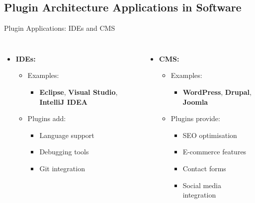 \documentclass[aspectratio=169, table]{beamer}
\begin{document}
\subsection{Plugin Architecture Applications in Software}

\begin{frame}{Plugin Applications: IDEs and CMS}
\begin{columns}
\begin{itemize}
	\item \textbf{IDEs:}
	\begin{itemize}
		\item Examples:
		\begin{itemize}
			\item \textbf{Eclipse}, \textbf{Visual Studio}, \textbf{IntelliJ IDEA}
		\end{itemize}
		\item Plugins add:
		\begin{itemize}
			\item Language support
			\item Debugging tools
			\item Git integration
		\end{itemize}
	\end{itemize}
\end{itemize}
\begin{itemize}
	\item \textbf{CMS:}
	\begin{itemize}
		\item Examples:
		\begin{itemize}
			\item \textbf{WordPress}, \textbf{Drupal}, \textbf{Joomla}
		\end{itemize}
		\item Plugins provide:
		\begin{itemize}
			\item SEO optimisation
			\item E-commerce features
			\item Contact forms
			\item Social media integration
		\end{itemize}
	\end{itemize}
\end{itemize}
\end{columns}
\end{frame}
\end{document}
